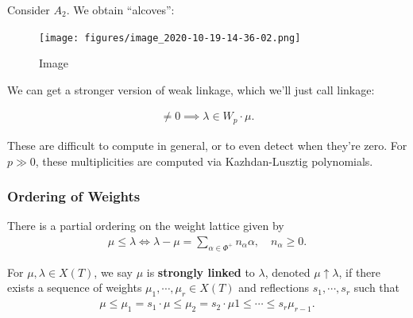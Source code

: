 \begin{example}

Consider \(A_2\). We obtain ``alcoves'':

\begin{figure}
\centering
\texttt{[image: figures/image\_2020-10-19-14-36-02.png]}
\caption{Image}
\end{figure}

\end{example}

We can get a stronger version of weak linkage, which we'll just call
linkage:

\begin{theorem}[Linkage]

\begin{align*}  
[H^0(\lambda): L(\mu)] \neq 0 \implies \lambda \in W_p \cdot \mu
.\end{align*}

\end{theorem}

\begin{warnings}

These are difficult to compute in general, or to even detect when
they're zero. For \(p\gg 0\), these multiplicities are computed via
Kazhdan-Lusztig polynomials.

\end{warnings}

\hypertarget{ordering-of-weights}{%
\subsubsection{Ordering of Weights}\label{ordering-of-weights}}

There is a partial ordering on the weight lattice given by
\begin{align*}  
\mu \leq \lambda \iff \lambda - \mu = \sum_{\alpha\in \Phi^+} n_\alpha \alpha, \quad n_\alpha \geq 0
.\end{align*}

\begin{definition}

For \(\mu, \lambda \in X(T)\), we say \(\mu\) is \textbf{strongly
linked} to \(\lambda\), denoted \(\mu \uparrow \lambda\), if there
exists a sequence of weights \(\mu_1, \cdots, \mu_r \in X(T)\) and
reflections \(s_1, \cdots, s_r\) such that
\begin{align*}  
\mu \leq \mu_1 = s_1 \cdot \mu \leq \mu_2 = s_2\cdot \mu 1 \leq \cdots \leq s_r \mu_{r-1}
.\end{align*}

\end{definition}

